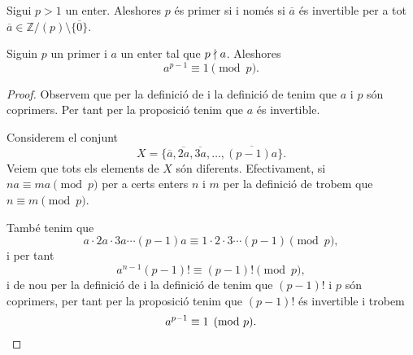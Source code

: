 \documentclass[../Apunts.tex]{subfiles}
\begin{document}
	\begin{corollary}
		\label{corollary:Z/(p) és un cos}
		\label{corollary:Z/(p) és un cos sii p és primer}
		Sigui \(p>1\) un enter. Aleshores \(p\) és primer si i només si \(\overline{a}\) és invertible per a tot \(\overline{a}\in\mathbb{Z}/(p)\setminus\{\overline{0}\}\).
	\end{corollary}
	\begin{theorem}
		\label{thm:el Petit Teorema de Fermat}
		Siguin \(p\) un primer i \(a\) un enter tal que \(p\mathrel{\nmid} a\). Aleshores
		\[a^{p-1}\equiv1\pmod{p}.\]
		\begin{proof}
			Observem que per la definició de  i la definició de  tenim que \(a\) i \(p\) són coprimers. Per tant per la proposició  tenim que \(a\) és invertible.
			
			Considerem el conjunt
			\[X=\{\overline{a},\overline{2a},\overline{3a},\dots,\overline{(p-1)a}\}.\]
			Veiem que tots els elements de \(X\) són diferents. Efectivament, si \(na\equiv ma\pmod{p}\) per a certs enters \(n\) i \(m\) per la definició de  trobem que \(n\equiv m\pmod{p}\).
			
			També tenim que
			\[a\cdot2a\cdot3a\cdots(p-1)a\equiv 1\cdot2\cdot3\cdots(p-1)\pmod{p},\]
			i per tant
			\[a^{n-1}(p-1)!\equiv(p-1)!\pmod{p},\]
			i de nou per la definició de  i la definició de  tenim que \((p-1)!\) i \(p\) són coprimers, per tant per la proposició  tenim que \((p-1)!\) és invertible i trobem
			\[a^{p-1}\equiv1\pmod{p}.\qedhere\]
		\end{proof}
	\end{theorem}
\end{document}
